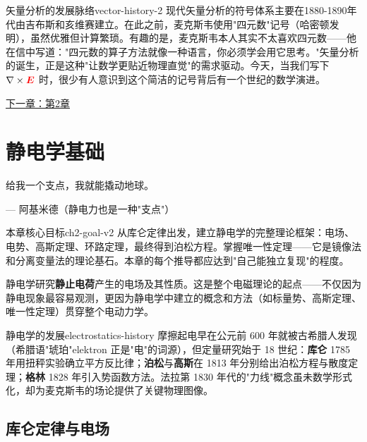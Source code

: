 \documentclass[11pt,a4paper,openany,oneside]{book}
\newcommand{\vecE}{\textcolor{red}{\vect{E}}}
\newcommand{\vect}[1]{\bm{#1}}
\newcommand{\curl}{\nabla\times}
\begin{document}
\begin{history}{矢量分析的发展脉络}{vector-history-2}
现代矢量分析的符号体系主要在1880-1890年代由吉布斯和亥维赛建立。在此之前，麦克斯韦使用"四元数"记号（哈密顿发明），虽然优雅但计算繁琐。有趣的是，麦克斯韦本人其实不太喜欢四元数——他在信中写道："四元数的算子方法就像一种语言，你必须学会用它思考。"矢量分析的诞生，正是这种"让数学更贴近物理直觉"的需求驱动。今天，当我们写下 $\curl\vecE$ 时，很少有人意识到这个简洁的记号背后有一个世纪的数学演进。
\end{history}



\begin{center}\small \hyperlink{ch2-goal}{下一章：第2章}\end{center}

\chapter{静电学基础}
\epigraph{给我一个支点，我就能撬动地球。}{--- 阿基米德（静电力也是一种"支点"）}

\hypertarget{ch2-goal}{}\begin{insight}{本章核心目标}{ch2-goal-v2}
从库仑定律出发，建立静电学的完整理论框架：电场、电势、高斯定理、环路定理，最终得到泊松方程。掌握唯一性定理——它是镜像法和分离变量法的理论基石。本章的每个推导都应达到"自己能独立复现"的程度。
\end{insight}

静电学研究\textbf{静止电荷}产生的电场及其性质。这是整个电磁理论的起点——不仅因为静电现象最容易观测，更因为静电学中建立的概念和方法（如标量势、高斯定理、唯一性定理）贯穿整个电动力学。

\begin{history}{静电学的发展}{electrostatics-history}
摩擦起电早在公元前 600 年就被古希腊人发现（希腊语"琥珀"elektron 正是"电"的词源），但定量研究始于 18 世纪：\textbf{库仑} 1785 年用扭秤实验确立平方反比律；\textbf{泊松}与\textbf{高斯}在 1813 年分别给出泊松方程与散度定理；\textbf{格林} 1828 年引入势函数方法。法拉第 1830 年代的"力线"概念虽未数学形式化，却为麦克斯韦的场论提供了关键物理图像。
\end{history}

\section{库仑定律与电场}
\end{document}
